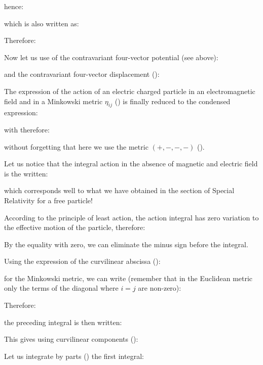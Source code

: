 	hence:
	
	which is also written as\label{action variation}:
	
	Therefore:
	
	Now let us use of the contravariant four-vector potential (see above):
	
	and the contravariant four-vector displacement ():
	
	The expression of the action of an electric charged particle in an electromagnetic field and in a Minkowski metric $\eta_{ij}$ () is finally reduced to the condensed expression:
	
	with therefore:
	
	without forgetting that here we use the metric $(+, -, -, -)$ ().
	
	Let us notice that the integral action in the absence of magnetic and electric field is the written:
	
	which corresponds well to what we have obtained in the section of Special Relativity for a free particle!

	According to the principle of least action, the action integral has zero variation to the effective motion of the particle, therefore:
	
	\begin{tcolorbox}[title=Remark,colframe=black,arc=10pt]
	By the equality with zero, we can eliminate the minus sign before the integral.
	\end{tcolorbox}
	Using the expression of the curvilinear abscissa ():
	
	for the Minkowski metric, we can write (remember that in the Euclidean metric only the terms of the diagonal where $i=j$ are non-zero):
	
	Therefore:
	
	the preceding integral is then written:
	
	This gives using curvilinear components ():
	
	Let us integrate by parts () the first integral:
	
